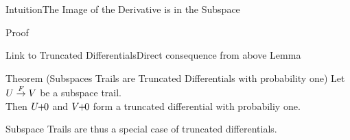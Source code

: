\begin{frame}{Intuition}{The Image of the Derivative is in the Subspace}
\begin{block}{Proof}
    \end{block}
\end{frame}

\begin{frame}{Link to Truncated Differentials}{Direct consequence from above Lemma}
    \begin{block}{Theorem (Subspaces Trails are Truncated Differentials with probability one)}
        \vspace{0.5em}
        Let $U \stackrel{F}{\rightarrow} V$ be a subspace trail.\\
        Then $U \!\! + \!\! 0$ and $V \!\! + \!\! 0$ form a truncated differential with probabiliy one.
        \vspace{0.5em}
    \end{block}
    Subspace Trails are thus a special case of truncated differentials.
\end{frame}

